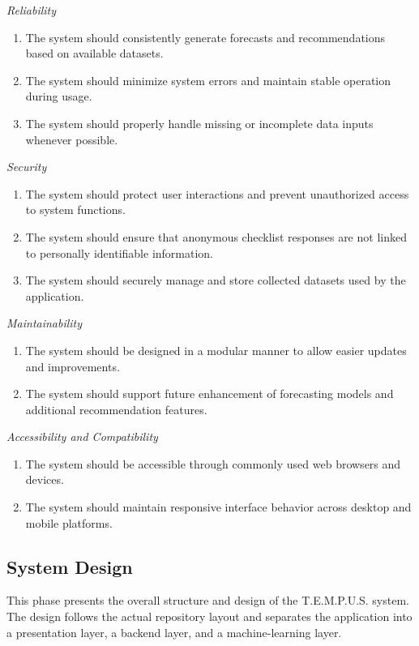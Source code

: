 \documentclass[12pt]{article}
\begin{document}
\noindent\textit{Reliability}
\begin{enumerate}
    \item The system should consistently generate forecasts and recommendations based on available datasets.
    \item The system should minimize system errors and maintain stable operation during usage.
    \item The system should properly handle missing or incomplete data inputs whenever possible.
\end{enumerate}

\noindent\textit{Security}
\begin{enumerate}
    \item The system should protect user interactions and prevent unauthorized access to system functions.
    \item The system should ensure that anonymous checklist responses are not linked to personally identifiable information.
    \item The system should securely manage and store collected datasets used by the application.
\end{enumerate}

\noindent\textit{Maintainability}
\begin{enumerate}
    \item The system should be designed in a modular manner to allow easier updates and improvements.
    \item The system should support future enhancement of forecasting models and additional recommendation features.
\end{enumerate}

\noindent\textit{Accessibility and Compatibility}
\begin{enumerate}
    \item The system should be accessible through commonly used web browsers and devices.
    \item The system should maintain responsive interface behavior across desktop and mobile platforms.
\end{enumerate}

\subsection{System Design}

This phase presents the overall structure and design of the T.E.M.P.U.S. system. The design follows the actual repository layout and separates the application into a presentation layer, a backend layer, and a machine-learning layer.
\end{document}
